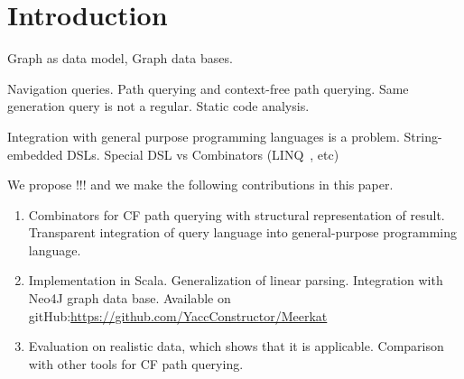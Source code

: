 \section{Introduction}

Graph as data model, Graph data bases.

Navigation queries.
Path querying and context-free path querying.
Same generation query is not a regular.
Static code analysis.

Integration with general purpose programming languages is a problem.
String-embedded DSLs.
Special DSL vs Combinators (LINQ~\cite{LINQ1, LINQ2}, etc)~\cite{ScalaGraphParsing}

We propose !!! and we make the following contributions in this paper.
\begin{enumerate}
\item Combinators for CF path querying with structural representation of result.
 Transparent integration of query language into general-purpose programming language.
\item Implementation in Scala. Generalization of linear parsing. Integration with Neo4J graph data base. Available on gitHub:\url{https://github.com/YaccConstructor/Meerkat}
\item Evaluation on realistic data, which shows that it is applicable. Comparison  with other tools 
for CF path querying.
\end{enumerate}
